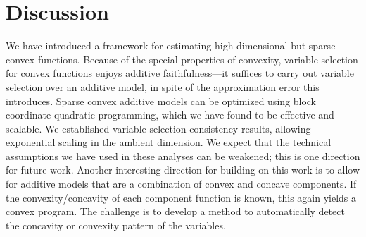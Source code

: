 \section{Discussion}

We have introduced a framework for estimating high dimensional but
sparse convex functions.  Because of the special properties of
convexity, variable selection for convex functions enjoys additive
faithfulness---it suffices to carry out variable selection over an
additive model, in spite of the approximation error this introduces.
Sparse convex additive models can be optimized using block coordinate
quadratic programming, which we have found to be effective and
scalable.  We established variable selection consistency results,
allowing exponential scaling in the ambient dimension.  We expect
that the technical assumptions we have used in these analyses can be
weakened; this is one direction for future work.  Another interesting
direction for building on this work is to allow for additive models that
are a combination of convex and concave components.  If the
convexity/concavity of each component function is known, this again
yields a convex program.  The challenge is to develop a method to
automatically detect the concavity or convexity pattern of the
variables.


